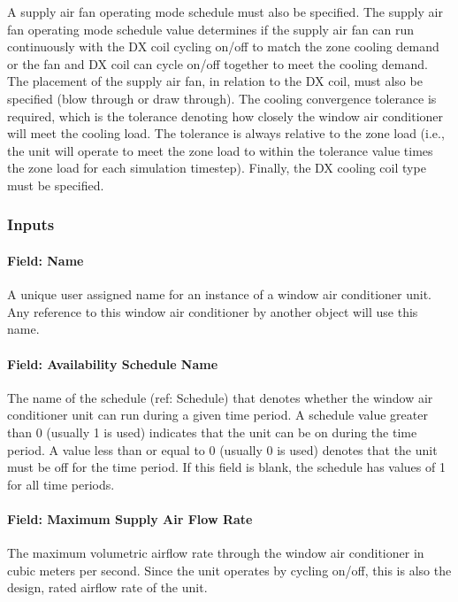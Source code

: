 A supply air fan operating mode schedule must also be specified. The supply air fan operating mode schedule value determines if the supply air fan can run continuously with the DX coil cycling on/off to match the zone cooling demand or the fan and DX coil can cycle on/off together to meet the cooling demand. The placement of the supply air fan, in relation to the DX coil, must also be specified (blow through or draw through). The cooling convergence tolerance is required, which is the tolerance denoting how closely the window air conditioner will meet the cooling load. The tolerance is always relative to the zone load (i.e., the unit will operate to meet the zone load to within the tolerance value times the zone load for each simulation timestep). Finally, the DX cooling coil type must be specified.

\subsubsection{Inputs}\label{inputs-7-031}

\paragraph{Field: Name}\label{field-name-7-025}

A unique user assigned name for an instance of a window air conditioner unit. Any reference to this window air conditioner by another object will use this name.

\paragraph{Field: Availability Schedule Name}\label{field-availability-schedule-name-6-005}

The name of the schedule (ref: Schedule) that denotes whether the window air conditioner unit can run during a given time period. A schedule value greater than 0 (usually 1 is used) indicates that the unit can be on during the time period. A value less than or equal to 0 (usually 0 is used) denotes that the unit must be off for the time period. If this field is blank, the schedule has values of 1 for all time periods.

\paragraph{Field: Maximum Supply Air Flow Rate}\label{field-maximum-supply-air-flow-rate-3}

The maximum volumetric airflow rate through the window air conditioner in cubic meters per second. Since the unit operates by cycling on/off, this is also the design, rated airflow rate of the unit.

